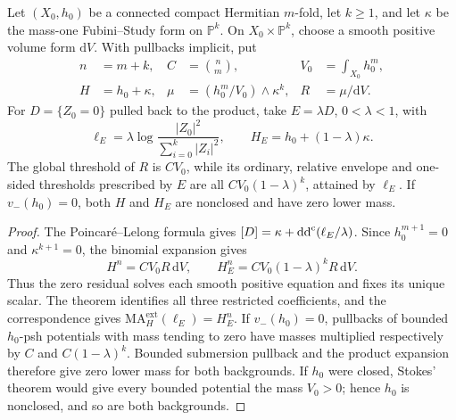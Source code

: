 \begin{example}\label{ex:projective-divisor-threshold-loss}
Let $(X_0,h_0)$ be a connected compact Hermitian $m$-fold, let $k\ge1$, and let $\kappa$ be the mass-one Fubini--Study form on $\mathbb P^k$. On $X_0\times\mathbb P^k$, choose a smooth positive volume form $\mathrm dV$. With pullbacks implicit, put
\[
 \begin{aligned}
 n&=m+k,& C&=\binom nm,& V_0&=\int_{X_0}h_0^m,\\
 H&=h_0+\kappa,& \mu&=(h_0^m/V_0)\wedge\kappa^k,& R&=\mu/\mathrm dV.
 \end{aligned}
\]
For $D=\{Z_0=0\}$ pulled back to the product, take $E=\lambda D$, $0<\lambda<1$, with
\[
 \ell_E=\lambda\log\frac{|Z_0|^2}{\sum_{i=0}^k|Z_i|^2},
 \qquad H_E=h_0+(1-\lambda)\kappa.
\]
The global threshold of $R$ is $CV_0$, while its ordinary, relative envelope and one-sided thresholds prescribed by $E$ are all $CV_0(1-\lambda)^k$, attained by $\ell_E$. If $v_-(h_0)=0$, both $H$ and $H_E$ are nonclosed and have zero lower mass.
\end{example}
\begin{proof}
The Poincar\'e--Lelong formula gives $[D]=\kappa+\mathrm{dd}^{\mathrm{c}}(\ell_E/\lambda)$. Since $h_0^{m+1}=0$ and $\kappa^{k+1}=0$, the binomial expansion gives
\[
 H^n=CV_0R\,\mathrm dV,\qquad
 H_E^n=CV_0(1-\lambda)^kR\,\mathrm dV.
\]
Thus the zero residual solves each smooth positive equation and fixes its unique scalar. The theorem identifies all three restricted coefficients, and the correspondence gives
$\mathrm{MA}^{\mathrm{ext}}_H(\ell_E)=H_E^n$.
If $v_-(h_0)=0$, pullbacks of bounded $h_0$-psh potentials with mass tending to zero have masses multiplied respectively by $C$ and $C(1-\lambda)^k$. Bounded submersion pullback and the product expansion therefore give zero lower mass for both backgrounds. If $h_0$ were closed, Stokes' theorem would give every bounded potential the mass $V_0>0$; hence $h_0$ is nonclosed, and so are both backgrounds.
\end{proof}
